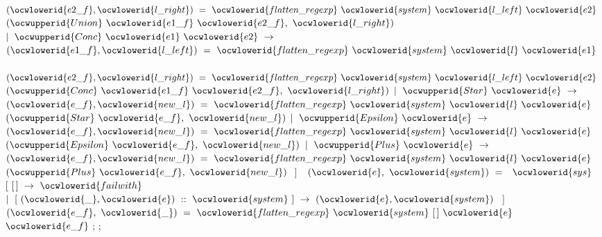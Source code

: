 \documentclass[12pt]{article}
\begin{document}
\ocwindent{4.00em}
~$(\ocwlowerid{e2\_f},\ocwlowerid{l\_right})~=~\ocwlowerid{flatten\_regexp}~\ocwlowerid{system}~\ocwlowerid{l\_left}~\ocwlowerid{e2}~$\ocweol
\ocwindent{4.00em}
$(\ocwupperid{Union}~\ocwlowerid{e1\_f}~\ocwlowerid{e2\_f},~\ocwlowerid{l\_right})$\ocweol
\ocwindent{2.00em}
$\mid{}~\ocwupperid{Conc}~\ocwlowerid{e1}~\ocwlowerid{e2}~\rightarrow{}~$\ocweol
\ocwindent{4.00em}
~$(\ocwlowerid{e1\_f},\ocwlowerid{l\_left})~=~\ocwlowerid{flatten\_regexp}~\ocwlowerid{system}~\ocwlowerid{l}~\ocwlowerid{e1}~$\ocweol
\ocwindent{4.00em}
~$(\ocwlowerid{e2\_f},\ocwlowerid{l\_right})~=~\ocwlowerid{flatten\_regexp}~\ocwlowerid{system}~\ocwlowerid{l\_left}~\ocwlowerid{e2}~$\ocweol
\ocwindent{4.00em}
$(\ocwupperid{Conc}~\ocwlowerid{e1\_f}~\ocwlowerid{e2\_f},~\ocwlowerid{l\_right})$\ocweol
\ocwindent{2.00em}
$\mid{}~\ocwupperid{Star}~\ocwlowerid{e}~\rightarrow{}~$\ocweol
\ocwindent{4.00em}
~$(\ocwlowerid{e\_f},\ocwlowerid{new\_l})~=~\ocwlowerid{flatten\_regexp}~\ocwlowerid{system}~\ocwlowerid{l}~\ocwlowerid{e}~$\ocweol
\ocwindent{4.00em}
$(\ocwupperid{Star}~\ocwlowerid{e\_f},~\ocwlowerid{new\_l})$\ocweol
\ocwindent{2.00em}
$\mid{}~\ocwupperid{Epsilon}~\ocwlowerid{e}~\rightarrow{}~$\ocweol
\ocwindent{4.00em}
~$(\ocwlowerid{e\_f},\ocwlowerid{new\_l})~=~\ocwlowerid{flatten\_regexp}~\ocwlowerid{system}~\ocwlowerid{l}~\ocwlowerid{e}~$\ocweol
\ocwindent{4.00em}
$(\ocwupperid{Epsilon}~\ocwlowerid{e\_f},~\ocwlowerid{new\_l})$\ocweol
\ocwindent{2.00em}
$\mid{}~\ocwupperid{Plus}~\ocwlowerid{e}~\rightarrow{}~$\ocweol
\ocwindent{4.00em}
~$(\ocwlowerid{e\_f},\ocwlowerid{new\_l})~=~\ocwlowerid{flatten\_regexp}~\ocwlowerid{system}~\ocwlowerid{l}~\ocwlowerid{e}~$\ocweol
\ocwindent{4.00em}
$(\ocwupperid{Plus}~\ocwlowerid{e\_f},~\ocwlowerid{new\_l})~$\ocweol
\ocwindent{2.00em}
$]~$\ocweol
\ocwindent{1.00em}
~$(\ocwlowerid{e},~\ocwlowerid{system})~=~$~$\ocwlowerid{sys}~$\ocweol
\ocwindent{2.00em}
$[~[\,]~\rightarrow{}~\ocwlowerid{failwith}~$\ocweol
\ocwindent{2.00em}
$\mid{}~[~(\ocwlowerid{\_},\ocwlowerid{e})~::~\ocwlowerid{system}~]~\rightarrow{}~(\ocwlowerid{e},\ocwlowerid{system})~$\ocweol
\ocwindent{2.00em}
$]~$\ocweol
\ocwindent{1.00em}
~$(\ocwlowerid{e\_f},~\ocwlowerid{\_})~=~\ocwlowerid{flatten\_regexp}~\ocwlowerid{system}~[\,]~\ocwlowerid{e}~$~\ocweol
\ocwindent{1.00em}
$\ocwlowerid{e\_f}$\ocweol
\ocwindent{0.00em}
;\ocweol
\ocwindent{0.00em}
;\medskip
\end{document}
